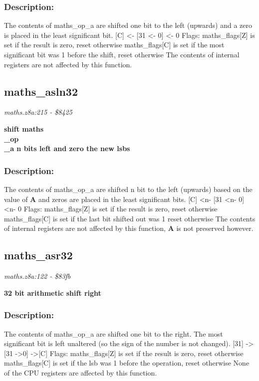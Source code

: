 \subsubsection{Description:}
 The contents of maths\_op\_a are shifted one bit to the left (upwards) and a zero is placed in the least significant bit. [C] \textless - [31 \textless - 0] \textless - 0 Flags:  maths\_flags[Z] is set if the result is zero, reset otherwise  maths\_flags[C] is set if the most significant bit was 1 before the shift,                 reset otherwise The contents of internal registers are not affected by this function.

\subsection{maths\_asln32}
\textit{maths.z8a:215 - \$8425}

\noindent
\textbf{shift maths\\\_op\\\_a n bits left and zero the new lsbs}

\subsubsection{Description:}
 The contents of maths\_op\_a are shifted n bit to the left (upwards) based on the value of \textbf{A} and zeros are placed in the least significant bits. [C] \textless n- [31 \textless n- 0] \textless n- 0 Flags:  maths\_flags[Z] is set if the result is zero, reset otherwise  maths\_flags[C] is set if the last bit shifted out was 1 reset otherwise The contents of internal registers are not affected by this function, \textbf{A} is not preserved however.

\subsection{maths\_asr32}
\textit{maths.z8a:122 - \$83fb}

\noindent
\textbf{32 bit arithmetic shift right}

\subsubsection{Description:}
 The contents of maths\_op\_a are shifted one bit to the right.  The most  significant bit is left unaltered (so the sign of the number is not changed).  [31] -\textgreater  [31 -\textgreater  0] -\textgreater  [C] Flags:  maths\_flags[Z] is set if the result is zero, reset otherwise  maths\_flags[C] is set if the lsb was 1 before the operation, reset otherwise None of the CPU registers are affected by this function.

